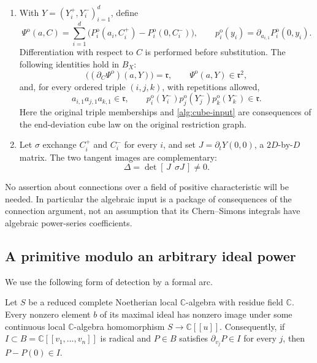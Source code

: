 \begin{definition}
\begin{enumerate}
\[\]
Then $L_i^\pm\subset\mathfrak m$ and
\begin{equation}
 (L_i^\pm)^3\subset\mathfrak r.
 \label{alg:cube-input}
\end{equation}
\item With $Y=(Y_i^+,Y_i^-)_{i=1}^d$, define
\[
 \Psi^{\mathrm{o}}(a,C)
 =\sum_{i=1}^d\bigl(P_i^{\mathrm{o}}(a_i,C_i^+)
                    -P_i^{\mathrm{o}}(0,C_i^-)\bigr),
 \qquad
 p_i^{\mathrm{o}}(y_i)=\partial_{a_{i,1}}P_i^{\mathrm{o}}(0,y_i).
\]
Differentiation with respect to $C$ is performed before substitution.
The following identities hold in $B_X$:
\begin{equation}
 \bigl((\partial_C\Psi^{\mathrm{o}})(a,Y)\bigr)=\mathfrak r,
 \qquad \Psi^{\mathrm{o}}(a,Y)\in\mathfrak r^2,
 \label{alg:value-gradient-input}
\end{equation}
and, for every ordered triple $(i,j,k)$, with repetitions allowed,
\begin{equation}
 a_{i,1}a_{j,1}a_{k,1}\in\mathfrak r,\qquad
 p_i^{\mathrm{o}}(Y_i^-)
 p_j^{\mathrm{o}}(Y_j^-)
 p_k^{\mathrm{o}}(Y_k^-)\in\mathfrak r.
 \label{alg:triple-input}
\end{equation}
Here the original triple memberships and
\eqref{alg:cube-input} are consequences of the end-deviation cube law on
the original restriction graph.
\item Let $\sigma$ exchange $C_i^+$ and $C_i^-$ for every $i$, and set
$J=\partial_tY(0,0)$, a $2D$-by-$D$ matrix. The two tangent images are
complementary:
\begin{equation}
 \Delta=\det[\,J\ \ \sigma J\,]\ne0.
 \label{alg:tangent-input}
\end{equation}
\end{enumerate}
\end{definition}

No assertion about connections over a field of positive characteristic
will be needed. In particular the algebraic input is a package of
consequences of the connection argument, not an assumption that its
Chern--Simons integrals have algebraic power-series coefficients.

\subsection{A primitive modulo an arbitrary ideal power}

We use the following form of detection by a formal arc.

\begin{lemma}
\label{alg:arc}
Let $S$ be a reduced complete Noetherian local $\mathbb C$-algebra with
residue field $\mathbb C$. Every nonzero element $b$ of its maximal
ideal has nonzero image under some continuous local
$\mathbb C$-algebra homomorphism $S\longrightarrow\mathbb C[[u]]$.
Consequently, if $I\subset B=\mathbb C[[v_1,\ldots,v_n]]$ is radical
and $P\in B$ satisfies $\partial_{v_j}P\in I$ for every $j$, then
$P-P(0)\in I$.
\end{lemma}

